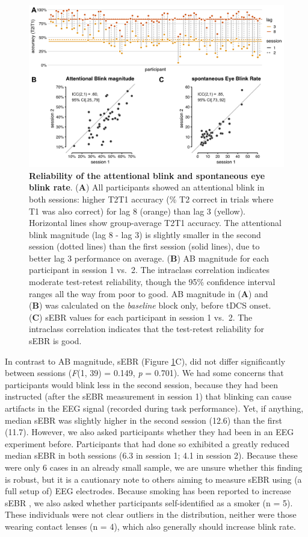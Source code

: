 \documentclass[11pt,]{memoir}
\begin{document}
\begin{figure}
\includegraphics[width=130mm]{AB_sEBR_files/figures/figure_4_retest} \caption{\textbf{Reliability of the attentional blink and spontaneous eye blink rate}. (\textbf{A}) All participants showed an attentional blink in both sessions: higher T2\textbar{}T1 accuracy (\% T2 correct in trials where T1 was also correct) for lag 8 (orange) than lag 3 (yellow). Horizontal lines show group-average T2\textbar{}T1 accuracy. The attentional blink magnitude (lag 8 - lag 3) is slightly smaller in the second session (dotted lines) than the first session (solid lines), due to better lag 3 performance on average. (\textbf{B}) AB magnitude for each participant in session 1 vs.~2. The intraclass correlation indicates moderate test-retest reliability, though the 95\% confidence interval ranges all the way from poor to good. AB magnitude in (\textbf{A}) and (\textbf{B}) was calculated on the \emph{baseline} block only, before tDCS onset. (\textbf{C}) sEBR values for each participant in session 1 vs.~2. The intraclass correlation indicates that the test-retest reliability for sEBR is good.}\label{fig:fig-retest}
\end{figure}



In contrast to AB magnitude, sEBR (Figure \ref{fig:fig-retest}C), did not differ significantly between sessions (\emph{F}(1, 39) = 0.149, \emph{p} = 0.701). We had some concerns that participants would blink less in the second session, because they had been instructed (after the sEBR measurement in session 1) that blinking can cause artifacts in the EEG signal (recorded during task performance). Yet, if anything, median sEBR was slightly higher in the second session (12.6) than the first (11.7). However, we also asked participants whether they had been in an EEG experiment before. Participants that had done so exhibited a greatly reduced median sEBR in both sessions (6.3 in session 1; 4.1 in session 2). Because these were only 6 cases in an already small sample, we are unsure whether this finding is robust, but it is a cautionary note to others aiming to measure sEBR using (a full setup of) EEG electrodes. Because smoking has been reported to increase sEBR \autocite{Klein1993}, we also asked whether participants self-identified as a smoker (n = 5). These individuals were not clear outliers in the distribution, neither were those wearing contact lenses (n = 4), which also generally should increase blink rate.
\end{document}
